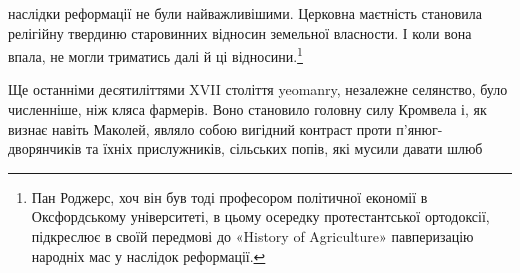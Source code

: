 наслідки реформації не були найважливішими. Церковна
маєтність становила релігійну твердиню старовинних відносин
земельної власности. І коли вона впала, не могли триматись
далі й ці відносини.\footnote{
Пан Роджерс, хоч він був тоді професором політичної економії в
Оксфордському університеті, в цьому осередку протестантської ортодоксії,
підкреслює в своїй передмові до «History of Agriculture» павперизацію
народніх мас у наслідок реформації.
}

Ще останніми десятиліттями XVII століття yeomanry, незалежне
селянство, було численніше, ніж кляса фармерів. Воно
становило головну силу Кромвела і, як визнає навіть Маколей,
являло собою вигідний контраст проти п’янюг-дворянчиків та
їхніх прислужників, сільських попів, які мусили давати шлюб
\parbreak{}  %

